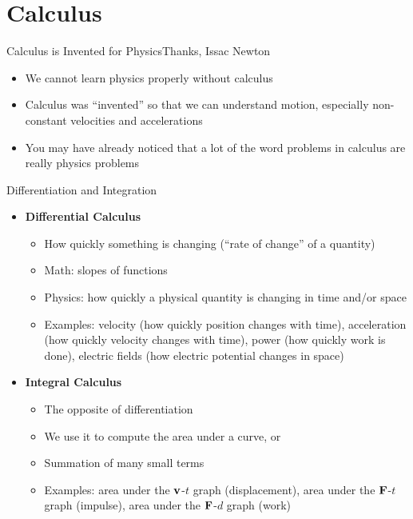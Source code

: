 \documentclass[12pt,compress,aspectratio=169]{beamer}
\newcommand{\mb}[1]{\ensuremath\mathbf{#1}}
\begin{document}
\section{Calculus}

\begin{frame}{Calculus is Invented for Physics}{Thanks, Issac Newton}
  \begin{itemize}
  \item We cannot learn physics properly without calculus %
  \item Calculus was ``invented'' so that we can understand motion, especially
    non-constant velocities and accelerations
  \item You may have already noticed that a lot of the word problems in
    calculus are really physics problems
  \end{itemize}
\end{frame}


\begin{frame}{Differentiation and Integration}
  \begin{itemize}
  \item\textbf{Differential Calculus}
    \begin{itemize}
    \item How quickly something is changing (``rate of change'' of a quantity)
    \item Math: slopes of functions
    \item Physics: how quickly a physical quantity is changing in time and/or
      space
    \item Examples: velocity (how quickly position changes with time),
      acceleration (how quickly velocity changes with time), power (how quickly
      work is done), electric fields (how electric potential changes in space)
    \end{itemize}
  \item\textbf{Integral Calculus}
    \begin{itemize}
    \item The opposite of differentiation
    \item We use it to compute the area under a curve, or
    \item Summation of many small terms
    \item Examples: area under the $\mb{v}$-$t$ graph (displacement), area
      under the $\mb{F}$-$t$ graph (impulse), area under the $\mb{F}$-$d$ graph
      (work)
    \end{itemize}
  \end{itemize}
\end{frame}
\end{document}
